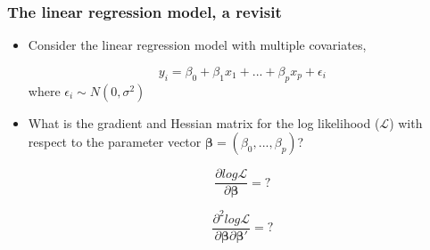 \documentclass[10pt]{beamer}
\begin{document}
\begin{frame}
  \frametitle{The linear regression model, a revisit}
  \begin{itemize}
  \item Consider the linear regression model with multiple covariates,

    \begin{equation*}
      y_i = \beta_0 + \beta_1x_1+...+\beta_p x_p + \epsilon_i
    \end{equation*}
    where $\epsilon_i \sim N(0, \sigma^2)$

  \item What is the gradient and Hessian matrix for the log likelihood ($\mathcal{L}$)
    with respect to the parameter vector $\bm{\beta}=(\beta_0,...,\beta_p)$?

    \begin{equation*}
      \frac{\partial log \mathcal{L}}{\partial \bm{\beta}} = ?
    \end{equation*}

    \begin{equation*}
      \frac{\partial^2 log \mathcal{L}}{\partial \bm{\beta} \partial \bm{\beta}'}
      = ?
    \end{equation*}

  \end{itemize}
\end{frame}
\end{document}

